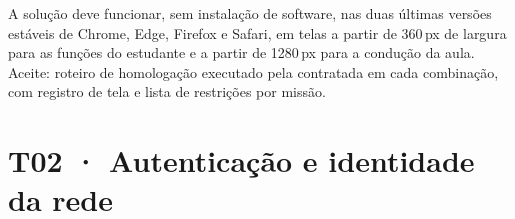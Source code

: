 \begin{paraotr}
A solução deve funcionar, sem instalação de software, nas duas últimas versões
estáveis de Chrome, Edge, Firefox e Safari, em telas a partir de 360\,px de
largura para as funções do estudante e a partir de 1280\,px para a condução da
aula. Aceite: roteiro de homologação executado pela contratada em cada
combinação, com registro de tela e lista de restrições por missão.
\end{paraotr}

\section{T02 · Autenticação e identidade da rede}
\label{sec:t02}

